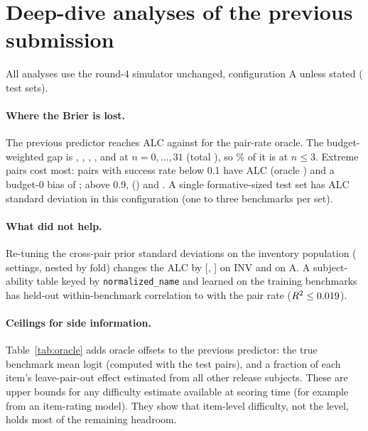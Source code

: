 \documentclass{article}
\begin{document}
\section{Deep-dive analyses of the previous submission}
\label{app:deepdive}

All analyses use the round-4 simulator unchanged, configuration A unless stated (\DdDiagNTestsets{} test sets).

\paragraph{Where the Brier is lost.} The previous predictor reaches ALC \DdDiagAlc{} against \DdDiagOracle{} for the pair-rate oracle. The budget-weighted gap is \DdGapBZero, \DdGapBOne, \DdGapBThree, \DdGapBSeven, \DdGapBFifteen{} and \DdGapBThirtyOne{} at $n=0,\dots,31$ (total \DdGapTotal), so \DdGapShareLow\% of it is at $n\le3$. Extreme pairs cost most: pairs with success rate below 0.1 have ALC \DdBinLowAlc{} (oracle \DdBinLowOracle) and a budget-0 bias of \DdBinLowBiasBZero; above 0.9, \DdBinHighAlc{} (\DdBinHighOracle) and \DdBinHighBiasBZero. A single formative-sized test set has ALC standard deviation \DdDiagTestsetSd{} in this configuration (one to three benchmarks per set).

\paragraph{What did not help.} Re-tuning the cross-pair prior standard deviations on the inventory population (\DdGridN{} settings, nested by fold) changes the ALC by \DdGridInvMean{} [\DdGridInvLo, \DdGridInvHi] on INV and \DdGridInvOnAMean{} on A. A subject-ability table keyed by \texttt{normalized\_name} and learned on the training benchmarks has held-out within-benchmark correlation \DdAbilityCorrMin{} to \DdAbilityCorrMax{} with the pair rate ($R^2\le0.019$).

\paragraph{Ceilings for side information.} Table~\ref{tab:oracle} adds oracle offsets to the previous predictor: the true benchmark mean logit (computed with the test pairs), and a fraction of each item's leave-pair-out effect estimated from all other release subjects. These are upper bounds for any difficulty estimate available at scoring time (for example from an item-rating model). They show that item-level difficulty, not the level, holds most of the remaining headroom.
\end{document}
